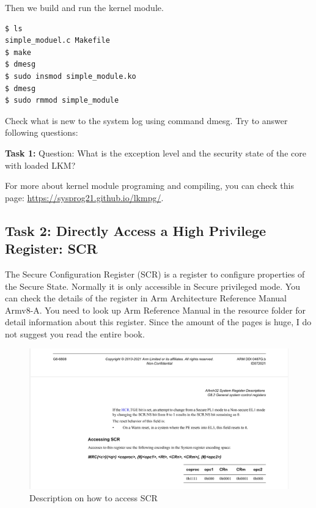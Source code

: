Then we build and run the kernel module. 

\begin{lstlisting}
$ ls
simple_moduel.c Makefile
$ make
$ dmesg
$ sudo insmod simple_module.ko
$ dmesg
$ sudo rmmod simple_module
\end{lstlisting}


Check what is new to the system log
using command dmesg. Try to answer following questions:

\textbf{Task 1:} Question: What is the exception level and the security state of the core with loaded LKM?

For more about kernel module programing and compiling, you can check this page:
\url{https://sysprog21.github.io/lkmpg/}.

\subsection{Task 2: Directly Access a High Privilege Register: SCR}

The Secure Configuration Register (SCR) is a register to configure properties of the Secure State. Normally it is only accessible in Secure privileged mode. You can check the details of the register in Arm Architecture Reference Manual Armv8-A. You need to look up Arm Reference Manual in the resource folder for detail information about this register. Since the amount of the pages is huge, I do not suggest you read the entire book.

\begin{figure}[h]
  \centering
  \includegraphics[scale=.50]{Accessing_SCR.png}
  \caption{Description on how to access SCR}
  \label{fig:access_scr}
\end{figure}

